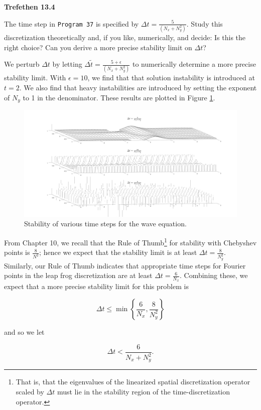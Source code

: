\textbf{Trefethen 13.4}

The time step in \texttt{Program 37} is specified by $\Delta t = \frac{5}{\left( N_x + N_y^2 \right)}$. Study this
discretization theoretically and, if you like, numerically, and decide: Is this the right choice? Can you derive a more
precise stability limit on $\Delta t$?

\begin{solution}
    We perturb $\Delta t$ by letting $\Delta \tilde{t} = \frac{5 + \epsilon}{\left( N_x + N_y^2 \right)}$ to 
    numerically determine a more precise stability limit. With $\epsilon = 10$, we find that that solution instability
    is introduced at $t = 2$. We also find that heavy instabilities are introduced by setting the exponent of $N_y$ to 1
    in the denominator. These results are plotted in Figure \ref{fig:problem_4}.

    \begin{figure}[h]
        \centering
        \includegraphics*[width=.95\textwidth]{problem_4.png}
        \caption{Stability of various time steps for the wave equation.}
        \label{fig:problem_4}
    \end{figure}

    From Chapter 10, we recall that the Rule of Thumb\footnote{
        That is, that the eigenvalues of the linearized spatial discretization operator scaled by $\Delta t$ must lie in
        the stability region of the time-discretization operator.
    } for stability with Chebyshev points is $\frac{8}{N^2}$; hence we
    expect that the stability limit is at least $\Delta t = \frac{8}{N_y^2}$. Similarly, our Rule of Thumb indicates 
    that appropriate time steps for Fourier points in the leap frog discretization are at least 
    $\Delta t = \frac{6}{N_x}$. Combining these, we expect that a more precise stability limit for this problem is 

    $$
        \Delta t \le \min{\left\{ \frac{6}{N_x}, \frac{8}{N_y^2} \right\}}
    $$

    and so we let 

    $$
        \Delta t < \frac{6}{N_x + N_y^2}.
    $$
\end{solution}